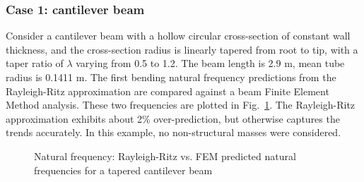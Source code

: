 \subsubsection{Case 1: cantilever beam}
Consider a cantilever beam with a hollow circular cross-section of constant wall thickness, and the cross-section radius is linearly tapered from root to tip, with a taper ratio of $\lambda$ varying from 0.5 to 1.2. The beam length is 2.9 m, mean tube radius is 0.1411 m. The first bending natural frequency predictions from the Rayleigh-Ritz approximation are compared against a beam Finite Element Method analysis. These two frequencies are plotted in Fig.~\ref{fig:beam_freq1}. The Rayleigh-Ritz approximation exhibits about 2\% over-prediction, but otherwise captures the trends accurately. In this example, no non-structural masses were considered.

\begin{figure}
     \centering
     \caption{Natural frequency: Rayleigh-Ritz vs. FEM predicted natural frequencies for a tapered cantilever beam}
     \label{fig:beam_freq1}
\end{figure}

